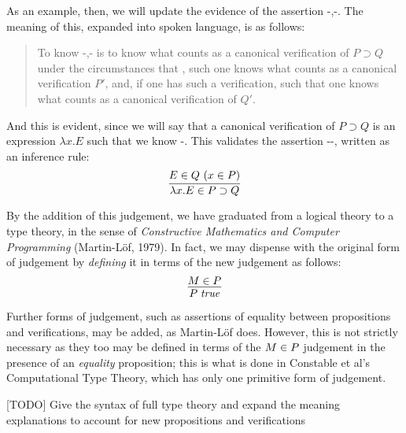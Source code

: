 \documentclass[main.tex]{subfiles}
\begin{document}
As an example, then, we will update the evidence of the assertion
\hyp{}{,\hyp{}{}}. The meaning
of this, expanded into spoken language, is as follows:
\begin{quote}
  To know \hyp{}{,\hyp{}{}} is
  to know what counts as a canonical verification of $P\supset Q$ under
  the circumstances that , such one knows what counts as a
  canonical verification $P'$, and, if one has such a verification,
   such that one knows what counts as a canonical verification of
  $Q'$.
\end{quote}

And this is evident, since we will say that a canonical verification of
$P\supset Q$ is an expression $\lambda x. E$ such that we know
\hyp{}{}. This validates the assertion \hyp{}{\hyp{}{}}, written as an inference rule:
\[
  \infer{
    \ver{\lambda x.E}{P\supset Q}
  }{
    \hyp{\ver{E}{Q}}{\ver{x}{P}}
  }
\]

By the addition of this judgement, we have graduated from a logical theory to a
type theory, in the sense of \emph{Constructive Mathematics and Computer
Programming} (Martin-L\"of, 1979). In fact, we may dispense with the original
 form of judgement by \emph{defining} it in terms of the new
 judgement as follows:
\[
  \infer{
    \istrue{P}
  }{
    \ver{M}{P}
  }
\]

Further forms of judgement, such as assertions of equality between propositions
and verifications, may be added, as Martin-L\"of does. However, this is not
strictly necessary as they too may be defined in terms of the $M\in P$
judgement in the presence of an \emph{equality} proposition; this is what is
done in Constable et al's Computational Type Theory, which has only one
primitive form of judgement.

[TODO] Give the syntax of full type theory and expand the meaning explanations
to account for new propositions and verifications
\end{document}
